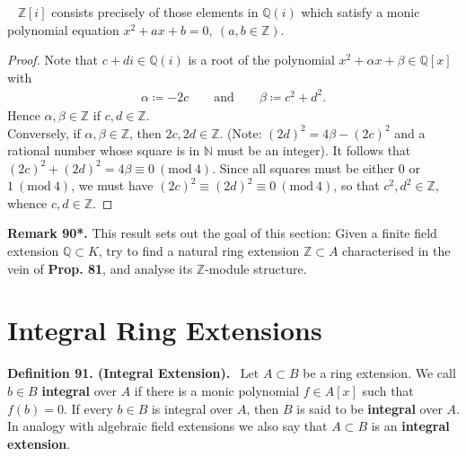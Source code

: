 \documentclass[12pt,a4paper,footinclude=true,headinclude=true]{scrbook} %
\newenvironment{proposition}[2][]
{\renewcommand\theinnercustomprop{#2}\innercustomprop[#1] 
\begin{mdframed}[backgroundcolor=gray!20]\ }
{\end{mdframed}\endinnercustomprop}
\newenvironment{definition}[2][Definition]
    { \begin{mdframed}[backgroundcolor=gray!20] \textbf{#1 #2.}\ }
    {  \end{mdframed}}
\newenvironment{remark}[2][Remark]
    { \begin{mdframed}[backgroundcolor=gray!20] \textbf{#1 #2.} }
    {  \end{mdframed}}
\begin{document}
\begin{proposition}{90}
    $\mathbb{Z}[i]$ consists precisely of those elements in $\mathbb{Q}(i)$ which satisfy a monic polynomial equation $x^2+ax+b=0,\ (a,b\in\mathbb{Z})$.
\end{proposition}
\begin{proof}
    Note that $c+di\in\mathbb{Q}(i)$ is a root of the polynomial $x^2+\alpha x+\beta \in\mathbb{Q}[x]$ with 
    \begin{align*}
        \alpha\coloneqq-2c\qquad\text{and}\qquad \beta\coloneqq c^2+d^2.
    \end{align*}
    Hence $\alpha,\beta\in\mathbb{Z}$ if $c,d\in\mathbb{Z}$.\\
    Conversely, if $\alpha,\beta\in\mathbb{Z}$, then $2c,2d\in\mathbb{Z}$. (Note: $(2d)^2=4\beta-(2c)^2$ and a rational number whose square is in $\mathbb{N}$ must be an integer). It follows that $(2c)^2+(2d)^2=4\beta\equiv0\ (\mathrm{mod}\ 4)$. Since all squares must be either $0$ or $1\ (\mathrm{mod}\ 4)$, we must have $(2c)^2\equiv(2d)^2\equiv0\ (\mathrm{mod}\ 4)$, so that $c^2,d^2\in\mathbb{Z}$, whence $c,d\in\mathbb{Z}$. 
\end{proof}

\begin{remark}{90*}
    This result sets out the goal of this section: Given a finite field extension $\mathbb{Q}\subset K$, try to find a natural ring extension $\mathbb{Z}\subset A$ characterised in the vein of \textbf{Prop. 81}, and analyse its $\mathbb{Z}$-module structure.
\end{remark}

\section{Integral Ring Extensions}
\begin{definition}{91. (Integral Extension)}
    Let $A\subset B$ be a ring extension. We call $b\in B$ \textbf{integral} over $A$ if there is a monic polynomial $f\in A[x]$ such that $f(b)=0$. If every $b\in B$ is integral over $A$, then $B$ is said to be \textbf{integral} over $A$. In analogy with algebraic field extensions we also say that $A\subset B$ is an \textbf{integral extension}.
\end{definition}
\end{document}
